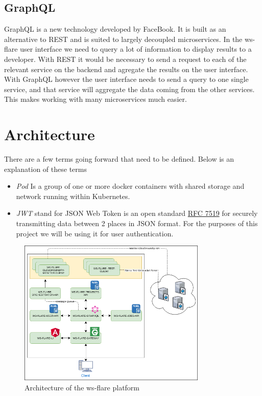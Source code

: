 \subsection{GraphQL}

GraphQL is a new technology developed by FaceBook. It is built as an alternative to REST and is suited to largely decoupled microservices. In the ws-flare user interface we need to query a lot of information to display results to a developer. With REST it would be necessary to send a request to each of the relevant service on the backend and agregate the results on the user interface. With GraphQL however the user interface needs to send a query to one single service, and that service will aggregate the data coming from the other services. This makes working with many microservices much easier.

\section{Architecture}

There are a few terms going forward that need to be defined. Below is an explanation of these terms

\begin{itemize}
  \item \emph{Pod} Is a group of one or more docker containers with shared storage and network running within Kubernetes.
  \item \emph{JWT} stand for JSON Web Token is an open standard \href{https://tools.ietf.org/html/rfc7519}{RFC 7519} for securely transmitting data between 2 places in JSON format. For the purposes of this project we will be using it for user authentication.
\end{itemize}

\begin{figure}[!h]
  \centering
    \includegraphics[width=0.8\textwidth]{figures/architecture.png}
    \caption{Architecture of the ws-flare platform}
    \label{fig:https-handshake}
\end{figure}

